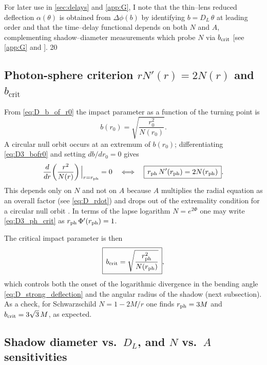 \documentclass{iopjournal}
\begin{document}
For later use in \cref{sec:delays} and \cref{app:G}, I note that the thin–lens reduced deflection $\alpha(\theta)$ is obtained from $\Delta\phi(b)$ by identifying $b=D_L\,\theta$ at leading order and that the time–delay functional depends on both $N$ and $A$, complementing shadow–diameter measurements which probe $N$ via $b_{\rm crit}$ [see \cref{app:G} and \cite{Perlick2004LRR}].
20
\subsection{\texorpdfstring{Photon-sphere criterion $rN'(r)=2N(r)$ and $b_{\mathrm{crit}}$}{Photon-sphere criterion rN′(r)=2N(r) and bcrit}}\label{app:D3}


From \eqref{eq:D_b_of_r0} the impact parameter as a function of the turning point is
\begin{equation}
b(r_0)=\sqrt{\frac{r_0^{2}}{N(r_0)}}.
\label{eq:D3_bofr0}
\end{equation}
A circular null orbit occurs at an extremum of $b(r_0)$; differentiating \eqref{eq:D3_bofr0} and setting $db/dr_0=0$ gives
\begin{equation}
\frac{d}{dr}\!\left(\frac{r^2}{N(r)}\right)\Big|_{r=r_{\rm ph}}=0
\quad\Longleftrightarrow\quad
\boxed{\,r_{\rm ph}\,N'(r_{\rm ph})=2N(r_{\rm ph})\,}.
\label{eq:D3_ph_crit}
\end{equation}
This depends only on $N$ and not on $A$ because $A$ multiplies the radial equation as an overall factor (see \eqref{eq:D_rdot}) and drops out of the extremality condition for a circular null orbit \cite{ClaudelVirbhadraEllis2001,Perlick2004LRR}. In terms of the lapse logarithm $N=e^{2\Phi}$ one may write \eqref{eq:D3_ph_crit} as $r_{\rm ph}\,\Phi'(r_{\rm ph})=1$.

The critical impact parameter is then
\begin{equation}
\boxed{\,b_{\rm crit}=\sqrt{\frac{r_{\rm ph}^2}{N(r_{\rm ph})}}\,},
\label{eq:D3_bcrit_repeat}
\end{equation}
which controls both the onset of the logarithmic divergence in the bending angle \eqref{eq:D_strong_deflection} and the angular radius of the shadow (next subsection). As a check, for Schwarzschild $N=1-2M/r$ one finds $r_{\rm ph}=3M$ and $b_{\rm crit}=3\sqrt{3}\,M$, as expected.

\subsection{\texorpdfstring{Shadow diameter vs.\ $D_L$, and $N$ vs.\ $A$ sensitivities}{Shadow diameter vs. DL, and N vs. A sensitivities}} \label{app:D4}
\end{document}
